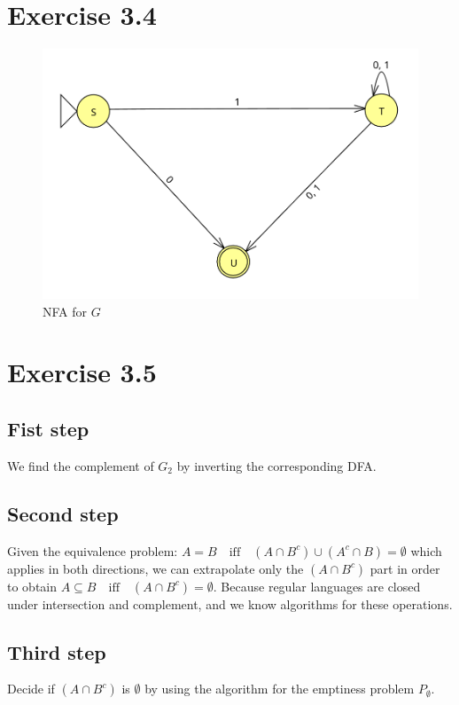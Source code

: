 \documentclass{article} %
\newcommand{\homeworkNumber}{3}
\begin{document}
\clearpage

\section*{Exercise \homeworkNumber.4}
\begin{figure}[h]
		\includegraphics[width=\linewidth]{ex4.png}
		\centering
		\caption{NFA for $G$}
	\end{figure}

\section*{Exercise \homeworkNumber.5}
\subsection*{Fist step}
We find the complement of $G_2$ by inverting the corresponding DFA.

\subsection*{Second step}
Given the equivalence problem: $A = B \quad \text{iff} \quad (A \cap B^c) \cup (A^c \cap B) = \emptyset$
which applies in both directions, we can extrapolate only the $(A \cap B^c)$ part in order to obtain $A \subseteq B \quad \text{iff} \quad (A \cap B^c) = \emptyset$. Because regular languages are closed under intersection and complement, and we know algorithms for these operations.

\subsection*{Third step}
Decide if $(A \cap B^c)$ is $\emptyset$ by using the algorithm for the emptiness problem $P_\emptyset$.
\end{document}
